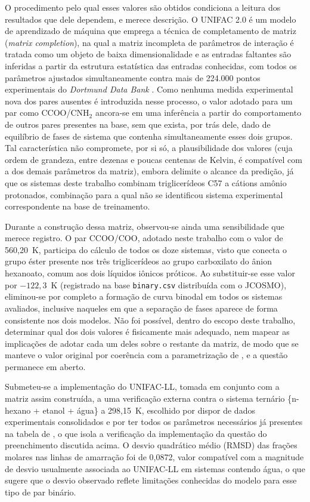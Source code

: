 O procedimento pelo qual esses valores são obtidos condiciona a leitura dos resultados que dele dependem, e merece descrição. O UNIFAC 2.0 é um modelo de aprendizado de máquina que emprega a técnica de completamento de matriz (\textit{matrix completion}), na qual a matriz incompleta de parâmetros de interação é tratada como um objeto de baixa dimensionalidade e as entradas faltantes são inferidas a partir da estrutura estatística das entradas conhecidas, com todos os parâmetros ajustados simultaneamente contra mais de 224.000 pontos experimentais do \textit{Dortmund Data Bank} \cite{hayer2025}. Como nenhuma medida experimental nova dos pares ausentes é introduzida nesse processo, o valor adotado para um par como CCOO/CNH$_2$ ancora-se em uma inferência a partir do comportamento de outros pares presentes na base, sem que exista, por trás dele, dado de equilíbrio de fases de sistema que contenha simultaneamente esses dois grupos. Tal característica não compromete, por si só, a plausibilidade dos valores (cuja ordem de grandeza, entre dezenas e poucas centenas de Kelvin, é compatível com a dos demais parâmetros da matriz), embora delimite o alcance da predição, já que os sistemas deste trabalho combinam triglicerídeos C57 a cátions amônio protonados, combinação para a qual não se identificou sistema experimental correspondente na base de treinamento.

Durante a construção dessa matriz, observou-se ainda uma sensibilidade que merece registro. O par CCOO/COO, adotado neste trabalho com o valor de 560,20~K, participa do cálculo de todos os doze sistemas, visto que conecta o grupo éster presente nos três triglicerídeos ao grupo carboxilato do ânion hexanoato, comum aos dois líquidos iônicos próticos. Ao substituir-se esse valor por $-122{,}3$~K (registrado na base \texttt{binary.csv} distribuída com o JCOSMO), eliminou-se por completo a formação de curva binodal em todos os sistemas avaliados, inclusive naqueles em que a separação de fases aparece de forma consistente nos dois modelos. Não foi possível, dentro do escopo deste trabalho, determinar qual dos dois valores é fisicamente mais adequado, nem mapear as implicações de adotar cada um deles sobre o restante da matriz, de modo que se manteve o valor original por coerência com a parametrização de , e a questão permanece em aberto.

Submeteu-se a implementação do UNIFAC-LL, tomada em conjunto com a matriz assim construída, a uma verificação externa contra o sistema ternário \{n-hexano + etanol + água\} a 298,15~K, escolhido por dispor de dados experimentais consolidados \cite{sorensen1980} e por ter todos os parâmetros necessários já presentes na tabela de , o que isola a verificação da implementação da questão do preenchimento discutida acima. O desvio quadrático médio (RMSD) das frações molares nas linhas de amarração foi de 0,0872, valor compatível com a magnitude de desvio usualmente associada ao UNIFAC-LL em sistemas contendo água, o que sugere que o desvio observado reflete limitações conhecidas do modelo para esse tipo de par binário.

